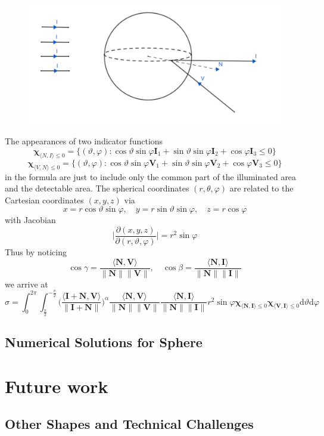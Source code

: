 \documentclass[11pt]{amsart}
\newcommand{\ip}[2]{\langle {#1}, {#2} \rangle}
\theoremstyle{definition}
\begin{document}
\begin{figure}[h!]
  \includegraphics[width=4.5in]{./figs/sphere.pdf}
  \label{fig:sphere}
\end{figure}
The appearances of two indicator functions 
$$\mathbf{\chi}_{\ip{N}{I}\leq 0}=\{(\vartheta,\varphi):\cos\vartheta\sin\varphi\mathbf{I}_1+\sin\vartheta\sin\varphi\mathbf{I}_2+\cos\varphi\mathbf{I}_3\leq 0\}$$ 
$$\mathbf{\chi}_{\ip{V}{N}\leq 0}=\{(\vartheta,\varphi): \cos\vartheta\sin\varphi\mathbf{V}_1+\sin\vartheta\sin\varphi\mathbf{V}_2+\cos\varphi\mathbf{V}_3\leq 0\}$$ 
in the formula are just to include only the common part of the illuminated area and the detectable area.
The spherical coordinates $(r,\theta,\varphi)$ are related to the Cartesian coordinates $(x,y,z)$ via
$$x =r\cos\vartheta \sin\varphi, \quad y=r\sin\vartheta \sin\varphi, \quad z=r\cos\varphi $$
with Jacobian 
$$\bigg|\frac{\partial(x,y,z)}{\partial(r,\vartheta,\varphi)}\bigg|= r^2 \sin\varphi $$
Thus by noticing 
$$\cos\gamma =\frac{\ip{\mathbf{N}}{\mathbf{V}}}{\|\mathbf{N}\| \|\mathbf{V}\|},\quad \cos\beta=\frac{\ip{\mathbf{N}}{\mathbf{I}}}{\|\mathbf{N}\| \|\mathbf{I}\|}$$
we arrive at
  $$\sigma =\int_{0}^{2\pi}\int_{\frac{\pi}{2}}^{-\frac{\pi}{2}}\Bigg(\frac{\ip{\mathbf{I}+\mathbf{N}}{\mathbf{V}}}{\|\mathbf{I}+\mathbf{N}\|}\Bigg)^\alpha\frac{\ip{\mathbf{N}}{\mathbf{V}}}{\|\mathbf{N}\| \|\mathbf{V}\|}\frac{\ip{\mathbf{N}}{\mathbf{I}}}{\|\mathbf{N}\| \|\mathbf{I}\|}r^2\sin\varphi\mathbf{\chi}_{\ip{\mathbf{N}}{\mathbf{I}}\leq 0}\mathbf{\chi}_{\ip{\mathbf{V}}{\mathbf{I}}\leq 0}\mathrm{d}\vartheta\mathrm{d}\varphi$$
  
\subsection{Numerical Solutions for Sphere}
\section{Future work}
\subsection{Other Shapes and Technical Challenges}
\end{document}
